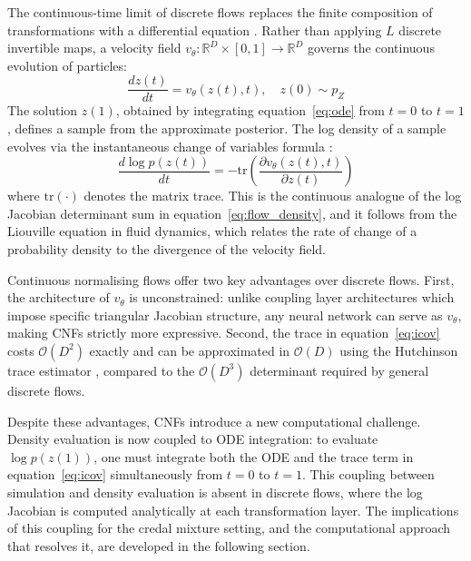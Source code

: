     The continuous-time limit of discrete flows replaces the finite composition of transformations with a differential equation \citep{chen2018}. Rather than applying $L$ discrete invertible maps, a velocity field $v_\theta : \mathbb{R}^D \times [0,1] \to \mathbb{R}^D$ governs the continuous evolution of particles:
    \begin{equation}
        \frac{dz(t)}{dt} = v_\theta(z(t), t), \quad z(0) \sim p_Z
        \label{eq:ode}
    \end{equation}
    The solution $z(1)$, obtained by integrating equation~\eqref{eq:ode} from $t=0$ to $t=1$, defines a sample from the approximate posterior. The log density of a sample evolves via the instantaneous change of variables formula \citep{chen2018}:
    \begin{equation}
        \frac{d \log p(z(t))}{dt} = -\mathrm{tr}\left(\frac{\partial v_\theta(z(t), t)}{\partial z(t)}\right)
        \label{eq:icov}
    \end{equation}
    where $\mathrm{tr}(\cdot)$ denotes the matrix trace. This is the continuous analogue of the log Jacobian determinant sum in equation~\eqref{eq:flow_density}, and it follows from the Liouville equation in fluid dynamics, which relates the rate of change of a probability density to the divergence of the velocity field.

    Continuous normalising flows offer two key advantages over discrete flows. First, the architecture of $v_\theta$ is unconstrained: unlike coupling layer architectures which impose specific triangular Jacobian structure, any neural network can serve as $v_\theta$, making CNFs strictly more expressive. Second, the trace in equation~\eqref{eq:icov} costs $\mathcal{O}(D^2)$ exactly and can be approximated in $\mathcal{O}(D)$ using the Hutchinson trace estimator \citep{hutchinson1990, grathwohl2019}, compared to the $\mathcal{O}(D^3)$ determinant required by general discrete flows.

    Despite these advantages, CNFs introduce a new computational challenge. Density evaluation is now coupled to ODE integration: to evaluate $\log p(z(1))$, one must integrate both the ODE and the trace term in equation~\eqref{eq:icov} simultaneously from $t=0$ to $t=1$. This coupling between simulation and density evaluation is absent in discrete flows, where the log Jacobian is computed analytically at each transformation layer. The implications of this coupling for the credal mixture setting, and the computational approach that resolves it, are developed in the following section.

